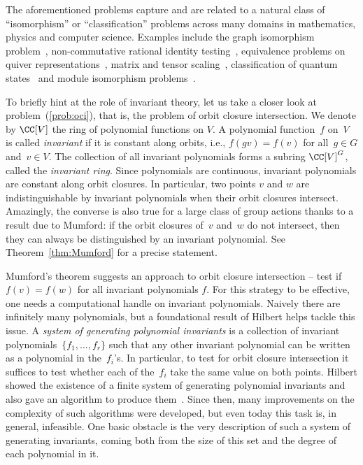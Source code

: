 The aforementioned problems capture and are related to a natural class of ``isomorphism'' or ``classification'' problems across many domains in mathematics, physics and computer science.
Examples include the graph isomorphism problem~\cite{Derksen-graph}, non-commutative rational identity testing~\cite{GGOW16,IQS2}, equivalence problems on quiver representations~\cite{DM-arbchar,DM-si}, matrix and tensor scaling~\cite{BGOWW,BFGOWW}, classification of quantum states~\cite{bennett1993teleporting} and module isomorphism problems~\cite{BL08}.

To briefly hint at the role of invariant theory, let us take a closer look at problem~(\ref{prob:oci}), that is, the problem of orbit closure intersection.
We denote by $\CC[V]$ the ring of polynomial functions on $V$.
A polynomial function~$f$ on~$V$ is called \emph{invariant} if it is constant along orbits, i.e., $f(gv) = f(v)$ for all~$g \in G$ and~$v \in V$.
The collection of all invariant polynomials forms a subring $\CC[V]^G$, called the \emph{invariant ring}.
Since polynomials are continuous, invariant polynomials are constant along orbit closures.
In particular, two points $v$ and $w$ are indistinguishable by invariant polynomials when their orbit closures intersect.
Amazingly, the converse is also true for a large class of group actions thanks to a result due to Mumford: if the orbit closures of~$v$ and~$w$ do not intersect, then they can always be distinguished by an invariant polynomial.
See Theorem~\ref{thm:Mumford} for a precise statement.

Mumford's theorem suggests an approach to orbit closure intersection -- test if $f(v) = f(w)$ for all invariant polynomials $f$.
For this strategy to be effective, one needs a computational handle on invariant polynomials.
Naively there are infinitely many polynomials, but a foundational result of Hilbert helps tackle this issue.
A \emph{system of generating polynomial invariants} is a collection of invariant polynomials~$\{f_1,\dots,f_r\}$ such that any other invariant polynomial can be written as a polynomial in the~$f_i$'s.
In particular, to test for orbit closure intersection it suffices to test whether each of the~$f_i$ take the same value on both points.
Hilbert showed the existence of a finite system of generating polynomial invariants and also gave an algorithm to produce them~\cite{Hilb1}.
Since then, many improvements on the complexity of such algorithms were developed, but even today this task is, in general, infeasible.
One basic obstacle is the very description of such a system of generating invariants, coming both from the size of this set and the degree of each polynomial in it.

